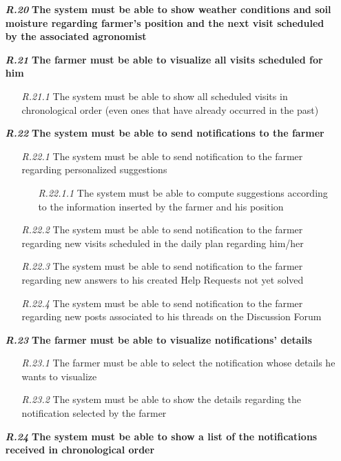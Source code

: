 \begin{itemize}
        \item [\textbf{\textit{R.20}}] \textbf{The system must be able to show weather conditions and soil moisture regarding farmer’s position and the next visit scheduled by the associated agronomist}
        \item [\textbf{\textit{R.21}}] \textbf{The farmer must be able to visualize all visits scheduled for him}
        \begin{itemize}
            \item [\textit{R.21.1}] The system must be able to show all scheduled visits in chronological order (even ones that have already occurred in the past)
        \end{itemize}
        \item [\textbf{\textit{R.22}}] \textbf{The system must be able to send notifications to the farmer}
        \begin{itemize}
            \item [\textit{R.22.1}] The system must be able to send notification to the farmer regarding personalized suggestions
        \begin{itemize}
            \item [\textit{R.22.1.1}] The system must be able to compute suggestions according to the information inserted by the farmer and his position
        \end{itemize}
            \item [\textit{R.22.2}] The system must be able to send notification to the farmer regarding new visits scheduled in the daily plan regarding him/her
            \item [\textit{R.22.3}] The system must be able to send notification to the farmer regarding new answers to his created Help Requests not yet solved
            \item [\textit{R.22.4}] The system must be able to send notification to the farmer regarding new posts associated to his threads on the Discussion Forum
        \end{itemize}
        \item [\textbf{\textit{R.23}}] \textbf{The farmer must be able to visualize notifications’ details}
        \begin{itemize}
            \item [\textit{R.23.1}] The farmer must be able to select the notification whose details he wants to visualize
            \item [\textit{R.23.2}] The system must be able to show the details regarding the notification selected by the farmer
        \end{itemize}
        \item [\textbf{\textit{R.24}}] \textbf{The system must be able to show a list of the notifications received in chronological order}





\end{itemize}
